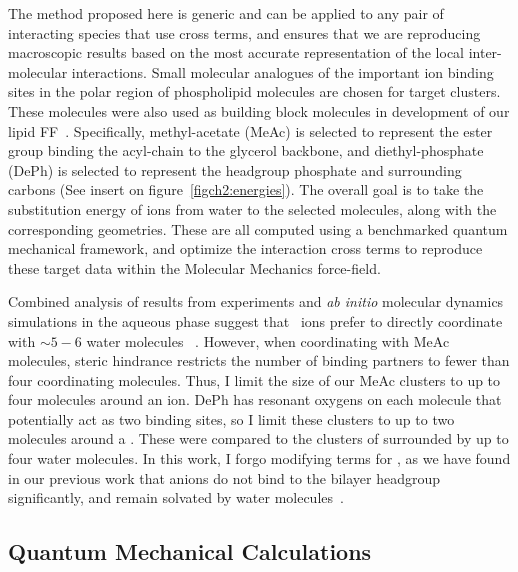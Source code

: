 The method proposed here is generic and can be applied to any pair of
interacting species that use cross terms, and ensures that we are
reproducing macroscopic results based on the most accurate
representation of the local inter-molecular interactions.
Small molecular analogues of the important ion binding
sites in the polar region of phospholipid
molecules are chosen for target clusters. 
These molecules were also used as building block molecules in development of our lipid
FF~\cite{kruczek:2017,chiu:2009}. Specifically,
methyl-acetate (MeAc) is selected to represent the ester group binding the
acyl-chain to the glycerol backbone, and diethyl-phosphate (DePh) is selected to
represent the headgroup phosphate and surrounding carbons (See insert on figure~\ref{figch2:energies}). 
The overall goal is to take the substitution energy of ions from
water to the selected molecules, along with the corresponding
geometries. These are all computed using a benchmarked quantum mechanical framework, 
and optimize the interaction cross terms to reproduce these target data 
within the Molecular Mechanics force-field.

Combined analysis of results from experiments and \emph{ab initio} molecular dynamics simulations
in the aqueous phase suggest that~\na{} ions prefer to directly coordinate 
with $\sim 5-6$ water molecules~
\cite{varma:2006:coordination,mason:2006:neutron,galib:2017:revisiting,timko:2010:dissociation,smirnov:2020}.
However, when coordinating with MeAc molecules, steric hindrance restricts the 
number of binding partners to fewer than four coordinating molecules.  
Thus, I limit the size of our MeAc clusters to up to four molecules around an ion. 
DePh has resonant oxygens on each molecule that potentially act as two binding sites, so I
limit these clusters to up to two molecules around a \na{}. These were
compared to the clusters of \na{} surrounded by up to four water
molecules.
In this work, I forgo modifying terms for \cl, as we have found in our previous work 
that anions do not bind to the bilayer headgroup significantly, and remain solvated 
by water molecules~\cite{kruczek:2017}.

\subsection{Quantum Mechanical Calculations}

